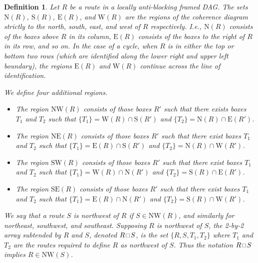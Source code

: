\documentclass[10pt,a4paper]{amsart}
\newtheorem{definition}{Definition}
\newcommand\NE{\mathrm{NE}}
\newcommand\NW{\mathrm{NW}}
\newcommand\SE{\mathrm{SE}}
\newcommand\SW{\mathrm{SW}}
\newcommand{\defn}[1]{\emph{\color{blue} #1}}
\newcommand\east{\mathrm{E}}
\newcommand\north{\mathrm{N}}
\newcommand\south{\mathrm{S}}
\newcommand\squarette{\scalebox{0.75}{\hbox{$\,\square\,$}}}
\newcommand\west{\mathrm{W}}
\begin{document}
\begin{definition}\label{def:diagramregions}
    Let $R$ be a route in a locally anti-blocking framed DAG.
    The sets $\north(R)$, $\south(R)$, $\east(R)$, and $\west(R)$ are the regions of the coherence diagram strictly to the north, south, east, and west of $R$ respectively. I.e., $\north(R)$ consists of the boxes above $R$ in its column, $\east(R)$ consists of the boxes to the right of $R$ in its row, and so on.
    In the case of a cycle, when $R$ is in either the top or bottom two rows (which are identified along the lower right and upper left boundary), the regions $\east(R)$ and $\west(R)$ continue across the line of identification.

    We define four additional regions.      \begin{itemize}
            \item The region $\NW(R)$ consists of those boxes $R'$ such that there exists boxes $T_1$ and $T_2$ such that $\{T_1\}=\west(R) \cap \south(R')$ and $\{T_2\}=\north(R) \cap \east(R')$.
            \item The region $\NE(R)$ consists of those boxes $R'$ such that there exist boxes $T_1$ and $T_2$ such that $\{T_1\}=\east(R) \cap \south(R')$ and $\{T_2\}=\north(R) \cap \west(R')$.
            \item The region $\SW(R)$ consists of those boxes $R'$ such that there exist boxes $T_1$ and $T_2$ such that $\{T_1\}=\west(R) \cap \north(R')$ and $\{T_2\}=\south(R) \cap \east(R')$.
            \item The region $\SE(R)$ consists of those boxes $R'$ such that there exist boxes $T_1$ and $T_2$ such that $\{T_1\}=\east(R) \cap \north(R')$ and $\{T_2\}=\south(R) \cap \west(R')$.
        \end{itemize}
    We say that a route $S$ is \defn{northwest} of $R$ if $S\in \NW(R)$, and similarly for northeast, southwest, and southeast.
    Supposing $R$ is northwest of $S$, the \defn{2-by-2 array} subtended by $R$ and $S$, denoted $R\squarette S$, is the set $\{R, S, T_1, T_2\}$ where $T_1$ and $T_2$ are the routes required to define $R$ as northwest of $S$. Thus the notation $R\squarette  S$ implies $R\in \NW(S)$.
\end{definition}
\end{document}
